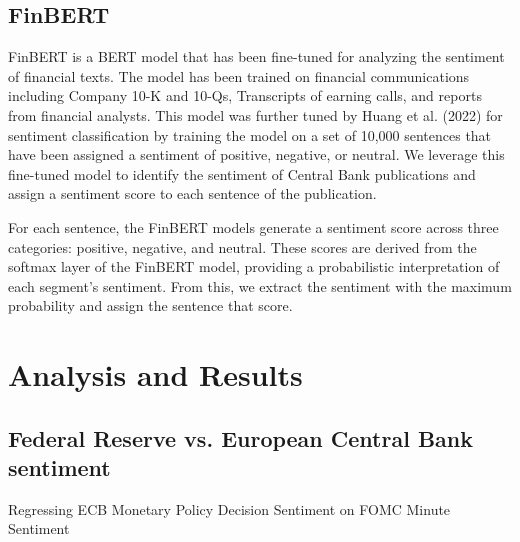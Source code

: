 \documentclass{article}
\begin{document}
\subsection{FinBERT}
FinBERT is a BERT model that has been fine-tuned for analyzing the sentiment of financial texts. 
The model has been trained on financial communications including Company 10-K and 10-Qs, Transcripts of earning calls, and reports from financial analysts. 
This model was further tuned by Huang et al. (2022) for sentiment classification by training the model on a set of 10,000 sentences that have been assigned a sentiment of positive, negative, or neutral. 
We leverage this fine-tuned model to identify the sentiment of Central Bank publications and assign a sentiment score to each sentence of the publication. 

For each sentence, the FinBERT models generate a sentiment score across three categories: positive, negative, and neutral. 
These scores are derived from the softmax layer of the FinBERT model, providing a probabilistic interpretation of each segment's sentiment. From this, we extract the sentiment with the maximum probability and assign the sentence that score.

\section{Analysis and Results}

\subsection{Federal Reserve vs. European Central Bank sentiment}

Regressing ECB Monetary Policy Decision Sentiment on FOMC Minute Sentiment
\end{document}
